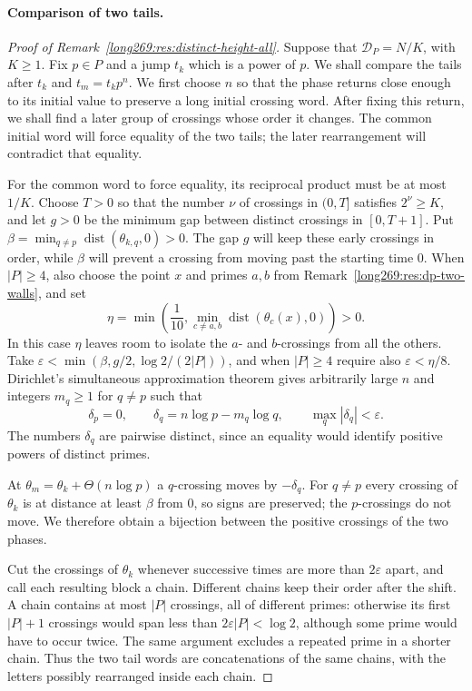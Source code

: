 \paragraph{Comparison of two tails.}\label{long269:sec:tail-comparison}
\begin{proof}[Proof of Remark~\ref{long269:res:distinct-height-all}]
Suppose that $\mathcal D_P=N/K$, with $K\ge1$. Fix $p\in P$ and a jump
$t_k$ which is a power of $p$. We shall compare the tails after $t_k$ and
$t_m=t_kp^n$. We first choose $n$ so that the phase returns close enough
to its initial value to preserve a long initial crossing word. After
fixing this return, we
shall find a later group of crossings whose order it changes. The
common initial word will force equality of the two tails; the later
rearrangement will contradict that equality.

For the common word to force equality, its reciprocal product must be
at most $1/K$. Choose $T>0$ so that the number $\nu$ of crossings in
$(0,T]$ satisfies $2^\nu\ge K$, and let $g>0$ be the minimum gap between
distinct crossings in $[0,T+1]$. Put
$\beta=\min_{q\ne p}\operatorname{dist}(\theta_{k,q},0)>0$.
The gap $g$ will keep these early crossings in order, while $\beta$
will prevent a crossing from moving past the starting time $0$.
When $|P|\ge4$, also choose the point $x$ and primes $a,b$ from
Remark~\ref{long269:res:dp-two-walls}, and set
\[
 \eta=\min\left(\frac1{10},
       \min_{c\ne a,b}\operatorname{dist}(\theta_c(x),0)\right)>0.
\]
In this case $\eta$ leaves room to isolate the $a$- and $b$-crossings
from all the others. Take $\varepsilon<\min(\beta,g/2,\log2/(2|P|))$, and when
$|P|\ge4$ require also $\varepsilon<\eta/8$. Dirichlet's simultaneous
approximation theorem gives arbitrarily large $n$ and integers $m_q\ge1$
for $q\ne p$ such that
\[
 \delta_p=0,\qquad \delta_q=n\log p-m_q\log q,\qquad
 \max_q|\delta_q|<\varepsilon.
\]
The numbers $\delta_q$ are pairwise distinct, since an equality would
identify positive powers of distinct primes.

At $\theta_m=\theta_k+\Theta(n\log p)$ a $q$-crossing moves by
$-\delta_q$. For $q\ne p$ every crossing of $\theta_k$ is at distance at
least $\beta$ from $0$, so signs are preserved; the $p$-crossings do not
move. We therefore obtain a bijection between the positive crossings of
the two phases.

Cut the crossings of $\theta_k$ whenever successive times are more than
$2\varepsilon$ apart, and call each resulting block a chain. Different
chains keep their order after the shift. A chain contains at most $|P|$
crossings, all of different primes: otherwise its first $|P|+1$ crossings
would span less than $2\varepsilon|P|<\log2$, although some prime would
have to occur twice. The same argument excludes a repeated prime in a
shorter chain. Thus the two tail words are concatenations of the same
chains, with the letters possibly rearranged inside each chain.


\end{proof}
